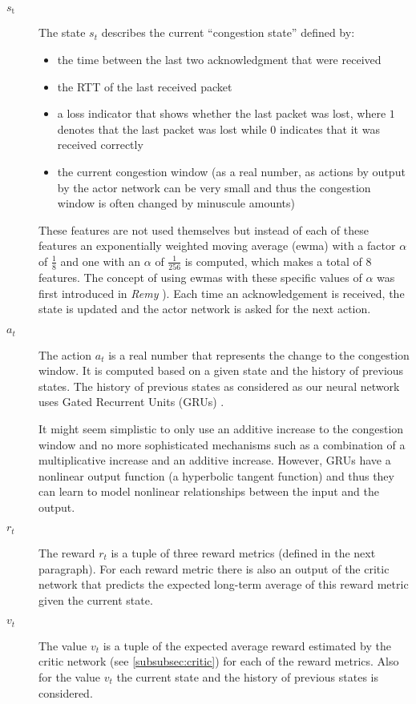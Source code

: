 \documentclass[newfonts=false,format=sigconf,10pt,letterpaper]{acmart}
\begin{document}
\begin{description}
\item[$\textit{s}_\text{t}$] The state $s_t$ describes the current ``congestion state'' defined by:
\begin{itemize}
\item the time between the last two acknowledgment that were received
\item the RTT of the last received packet
\item a loss indicator that shows whether the last packet was lost, where $1$ denotes that the last packet was lost while $0$ indicates that it was received correctly
\item the current congestion window (as a real number, as actions by output by the actor network can be very small and thus the congestion window is often changed by minuscule amounts)%
\end{itemize}
These features are not used themselves but instead of each of these features an exponentially weighted moving average (ewma) with a factor $\alpha$ of $\frac{1}{8}$ and one with an $\alpha$ of $\frac{1}{256}$ is computed, which makes a total of 8 features. The concept of using ewmas with these specific values of $\alpha$ was first introduced in \textit{Remy} \cite{winstein_tcp_2013}).
Each time an acknowledgement is received, the state is updated and the actor network is asked for the next action.
\item[$\textit{a}_t$] The action $a_t$ is a real number that represents the change to the congestion window. It is computed based on a given state and the history of previous states. The history of previous states as considered as our neural network uses Gated Recurrent Units (GRUs) \cite{cho_learning_2014}.  

It might seem simplistic to only use an additive increase to the congestion window and no more sophisticated mechanisms such as a combination of a multiplicative increase and an additive increase. However, GRUs have a nonlinear output function (a hyperbolic tangent function) and thus they can learn to model nonlinear relationships between the input and the output. 
\item[$\textit{r}_t$] The reward $r_t$ is a tuple of three reward metrics (defined in the next paragraph). 
For each reward metric there is also an output of the critic network that predicts the expected long-term average of this reward metric given the current state. 
\item[$\textit{v}_t$] The value $v_t$ is a tuple of the expected average reward estimated by the critic network (see \autoref{subsubsec:critic}) for each of the reward metrics. Also for the value $v_t$ the current state and the history of previous states is considered. 
\end{description}
\end{document}
